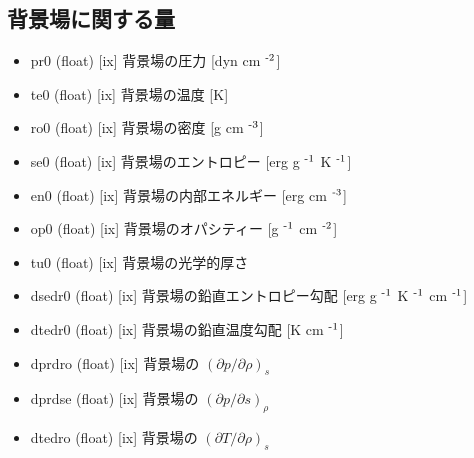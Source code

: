 \documentclass[letterpaper,10pt,dvipdfmx,report]{sphinxmanual}
\begin{document}
\subsection{背景場に関する量}
\label{\detokenize{notation:id3}}\begin{itemize}
\item {} 
pr0 (float) {[}ix{]} \sphinxhyphen{}\sphinxhyphen{} 背景場の圧力 {[}dyn cm $^{\text{\sphinxhyphen{}2}}${]}

\item {} 
te0 (float) {[}ix{]} \sphinxhyphen{}\sphinxhyphen{} 背景場の温度 {[}K{]}

\item {} 
ro0 (float) {[}ix{]} \sphinxhyphen{}\sphinxhyphen{} 背景場の密度 {[}g cm $^{\text{\sphinxhyphen{}3}}${]}

\item {} 
se0 (float) {[}ix{]} \sphinxhyphen{}\sphinxhyphen{} 背景場のエントロピー {[}erg g $^{\text{\sphinxhyphen{}1}}$ K $^{\text{\sphinxhyphen{}1}}${]}

\item {} 
en0 (float) {[}ix{]} \sphinxhyphen{}\sphinxhyphen{} 背景場の内部エネルギー {[}erg cm $^{\text{\sphinxhyphen{}3}}${]}

\item {} 
op0 (float) {[}ix{]} \sphinxhyphen{}\sphinxhyphen{} 背景場のオパシティー {[}g $^{\text{\sphinxhyphen{}1}}$ cm $^{\text{\sphinxhyphen{}2}}${]}

\item {} 
tu0 (float) {[}ix{]} \sphinxhyphen{}\sphinxhyphen{} 背景場の光学的厚さ

\item {} 
dsedr0 (float) {[}ix{]} \sphinxhyphen{}\sphinxhyphen{} 背景場の鉛直エントロピー勾配 {[}erg g $^{\text{\sphinxhyphen{}1}}$ K $^{\text{\sphinxhyphen{}1}}$ cm $^{\text{\sphinxhyphen{}1}}${]}

\item {} 
dtedr0 (float) {[}ix{]} \sphinxhyphen{}\sphinxhyphen{} 背景場の鉛直温度勾配 {[}K cm $^{\text{\sphinxhyphen{}1}}${]}

\item {} 
dprdro (float) {[}ix{]} \sphinxhyphen{}\sphinxhyphen{} 背景場の \((\partial p/\partial \rho)_s\)

\item {} 
dprdse (float) {[}ix{]} \sphinxhyphen{}\sphinxhyphen{} 背景場の \((\partial p/\partial s)_\rho\)

\item {} 
dtedro (float) {[}ix{]} \sphinxhyphen{}\sphinxhyphen{} 背景場の \((\partial T/\partial \rho)_s\)


\end{itemize}
\end{document}
